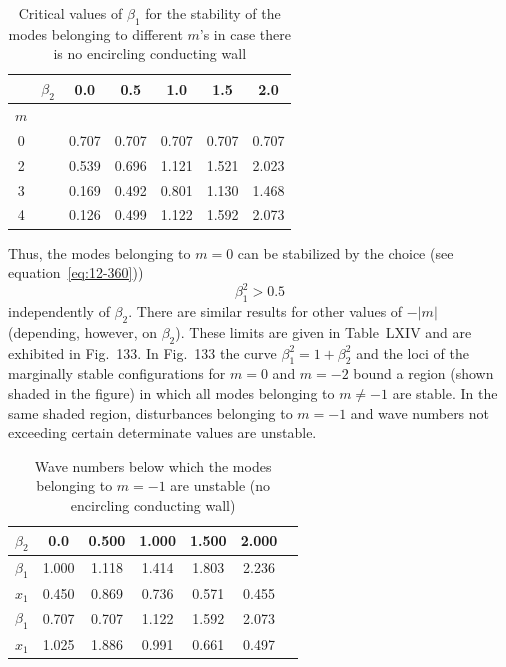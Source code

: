 \begin{table}[ht]
\centering
\caption{Critical values of $\beta_1$ for the stability of the modes belonging to different $m$'s in case there is no encircling conducting wall}
\label{tab:LXIV}
\begin{tabular}{ccccccc}
\hline
& $\beta_2$ & 0.0 & 0.5 & 1.0 & 1.5 & 2.0 \\
\hline
$m$ & & & & & & \\
0 & & 0.707 & 0.707 & 0.707 & 0.707 & 0.707 \\
2 & & 0.539 & 0.696 & 1.121 & 1.521 & 2.023 \\
3 & & 0.169 & 0.492 & 0.801 & 1.130 & 1.468 \\
4 & & 0.126 & 0.499 & 1.122 & 1.592 & 2.073 \\
\hline
\end{tabular}
\end{table}

Thus, the modes belonging to $m = 0$ can be stabilized by the choice (see equation~\eqref{eq:12-360}))
\begin{equation}
\label{eq:12-362}
\beta_1^2 > 0.5
\end{equation}
independently of $\beta_2$. There are similar results for other values of $-|m|$ (depending, however, on $\beta_2$). These limits are given in Table~LXIV and are exhibited in Fig.~133. In Fig.~133 the curve $\beta_1^2 = 1+\beta_2^2$ and the loci of the marginally stable configurations for $m = 0$ and $m = -2$ bound a region (shown shaded in the figure) in which all modes belonging to $m \neq -1$ are stable. In the same shaded region, disturbances belonging to $m = -1$ and wave numbers not exceeding certain determinate values are unstable.


\begin{table}[ht]
\centering
\caption{Wave numbers below which the modes belonging to $m = -1$ are unstable (no encircling conducting wall)}
\label{tab:LXV}
\begin{tabular}{ccccccc}
\hline
$\beta_2$ & 0.0 & 0.500 & 1.000 & 1.500 & 2.000 \\
\hline
$\beta_1$ & 1.000 & 1.118 & 1.414 & 1.803 & 2.236 \\
$x_1$ & 0.450 & 0.869 & 0.736 & 0.571 & 0.455 \\
$\beta_1$ & 0.707 & 0.707 & 1.122 & 1.592 & 2.073 \\
$x_1$ & 1.025 & 1.886 & 0.991 & 0.661 & 0.497 \\
\hline
\end{tabular}
\end{table}

